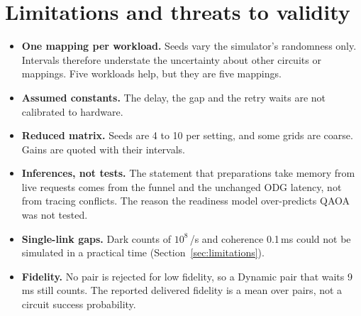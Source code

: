 \documentclass[11pt,a4paper]{report}
\newcommand{\ms}{\,ms}
\begin{document}
\chapter{Limitations and threats to validity}\label{ch:limits}
\begin{itemize}
\item \textbf{One mapping per workload.} Seeds vary the simulator's randomness only. Intervals therefore understate the uncertainty about other circuits or mappings. Five workloads help, but they are five mappings.
\item \textbf{Assumed constants.} The delay, the gap and the retry waits are not calibrated to hardware.
\item \textbf{Reduced matrix.} Seeds are 4 to 10 per setting, and some grids are coarse. Gains are quoted with their intervals.
\item \textbf{Inferences, not tests.} The statement that preparations take memory from live requests comes from the funnel and the unchanged ODG latency, not from tracing conflicts. The reason the readiness model over-predicts QAOA was not tested.
\item \textbf{Single-link gaps.} Dark counts of $10^8$\,/s and coherence 0.1\,ms could not be simulated in a practical time (Section~\ref{sec:limitations}).
\item \textbf{Fidelity.} No pair is rejected for low fidelity, so a Dynamic pair that waits 9\ms{} still counts. The reported delivered fidelity is a mean over pairs, not a circuit success probability.
\end{itemize}
\end{document}
